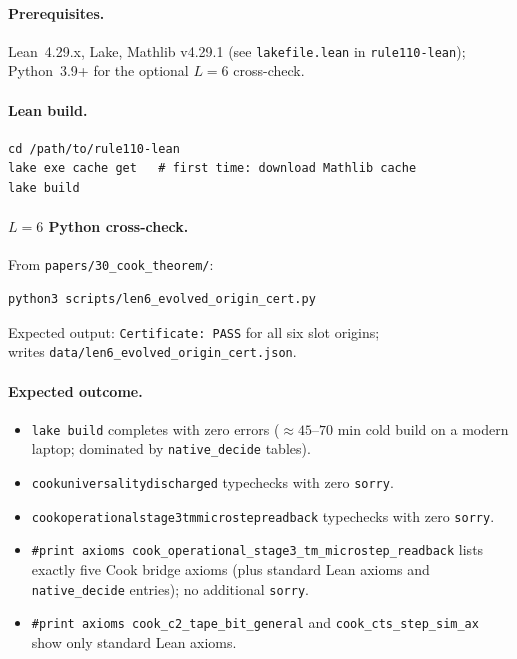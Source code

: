\documentclass[11pt]{article}
\theoremstyle{remark}
\newcommand{\lean}[1]{%
  \penalty-100
  \begingroup\def\_{\textunderscore\allowbreak}\texttt{#1}\endgroup}
\begin{document}
\begin{appendices}
\paragraph{Prerequisites.}
Lean~4.29.x, Lake, Mathlib v4.29.1 (see \texttt{lakefile.lean} in \texttt{rule110-lean});
Python~3.9+ for the optional $L{=}6$ cross-check.

\paragraph{Lean build.}
\begin{verbatim}
cd /path/to/rule110-lean
lake exe cache get   # first time: download Mathlib cache
lake build
\end{verbatim}

\paragraph{$L{=}6$ Python cross-check.}
From \texttt{papers/30\_cook\_theorem/}:
\begin{verbatim}
python3 scripts/len6_evolved_origin_cert.py
\end{verbatim}
Expected output: \texttt{Certificate: PASS} for all six slot origins;\\
writes \texttt{data/len6\_evolved\_origin\_cert.json}.

\paragraph{Expected outcome.}
\begin{itemize}[leftmargin=1.2em]
  \item \texttt{lake build} completes with zero errors (${\approx}45$--$70$ min cold build
    on a modern laptop; dominated by \texttt{native\_decide} tables).
  \item \lean{cook\_universality\_discharged} typechecks with zero \texttt{sorry}.
  \item \lean{cook\_operational\_stage3\_tm\_microstep\_readback} typechecks with zero \texttt{sorry}.
  \item \texttt{\#print axioms cook\_operational\_stage3\_tm\_microstep\_readback} lists exactly five Cook bridge axioms (plus standard Lean axioms and \texttt{native\_decide} entries); no additional \texttt{sorry}.
  \item \texttt{\#print axioms cook\_c2\_tape\_bit\_general} and \texttt{cook\_cts\_step\_sim\_ax} show only standard Lean axioms.
\end{itemize}


\end{appendices}
\end{document}
